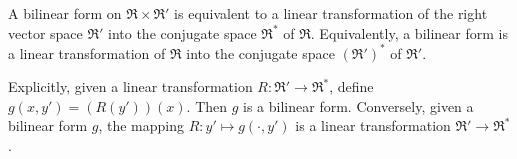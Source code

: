 A bilinear form on $\mathfrak{R} \times \mathfrak{R}'$ is equivalent to a linear transformation of the right vector space $\mathfrak{R}'$ into the conjugate space $\mathfrak{R}^*$ of $\mathfrak{R}$. Equivalently, a bilinear form is a linear transformation of $\mathfrak{R}$ into the conjugate space $(\mathfrak{R}')^*$ of $\mathfrak{R}'$.

Explicitly, given a linear transformation $R: \mathfrak{R}' \to \mathfrak{R}^*$, define $g(x, y') = (R(y'))(x)$. Then $g$ is a bilinear form. Conversely, given a bilinear form $g$, the mapping $R: y' \mapsto g(\cdot, y')$ is a linear transformation $\mathfrak{R}' \to \mathfrak{R}^*$.
